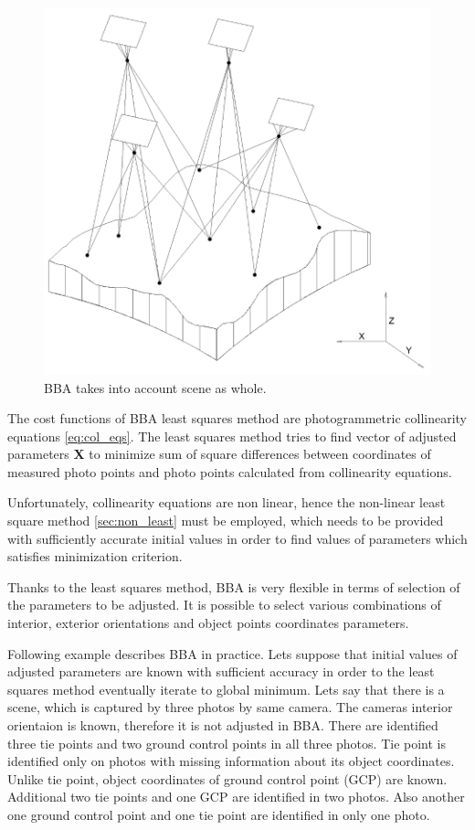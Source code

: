 \documentclass[a4paper,12pt]{article}
\newcommand{\evect}[1]{
{\bf #1}
}
\begin{document}
\begin{figure}[h]
    \centering
    \includegraphics[scale=0.3]{figures/bba.png}
    \caption{BBA takes into account scene as whole.}
    \label{fig:rel_or_amb}
\end{figure}

The cost functions of BBA least squares method are photogrammetric collinearity equations \eqref{eq:col_eqs}.
The least squares method tries to find vector of adjusted parameters \evect{X} to minimize
sum  of square differences between coordinates of measured photo points and photo points calculated 
from collinearity equations.

Unfortunately, collinearity equations are non linear, hence the non-linear least square method \ref{sec:non_least} must be employed, which 
needs to be provided  with sufficiently accurate initial values in order to find values of parameters which satisfies minimization criterion.

Thanks to the least squares method, BBA is very flexible in terms of selection of the parameters to be adjusted. 
It is possible to select various combinations of interior, exterior orientations and object points coordinates parameters. 

Following example describes BBA in practice.
Lets suppose that initial values of adjusted parameters are known with sufficient accuracy in order to the least squares
method eventually iterate to global minimum.
Lets say that there is a scene, which is captured by three photos by same camera.
The cameras interior orientaion is known, therefore it is not adjusted in BBA.
There are identified three tie points and two ground control points in all three photos.
Tie point is identified only on photos with missing information about its object coordinates.  
Unlike tie point, object coordinates of ground control point (GCP) are known.
Additional two tie points and one GCP are identified in two photos.
Also another one ground control point and one tie point are identified 
in only one photo. 
\end{document}
